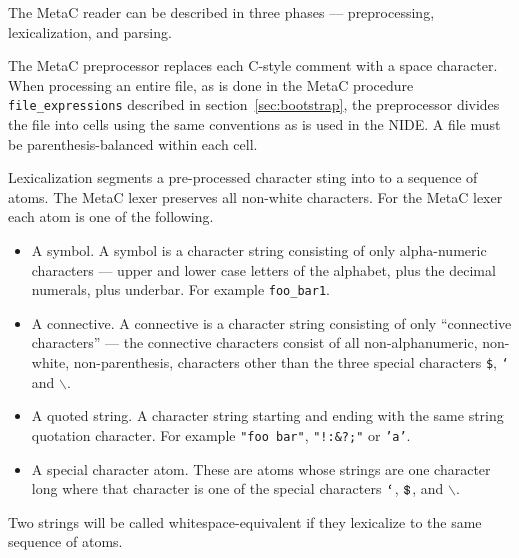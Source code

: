 \documentclass{article}
\newcommand{\mtt}[1]{\mbox{\tt #1}}
\begin{document}
The MetaC reader can be described in three phases --- preprocessing, lexicalization, and parsing.

The MetaC preprocessor replaces each C-style comment with a space character.  When processing an entire file,
as is done in the MetaC procedure {\tt file\_expressions}
described in section~\ref{sec:bootstrap}, the preprocessor divides the file into
cells using the same conventions as is used in the NIDE.
A file must be parenthesis-balanced within each cell.

Lexicalization segments a pre-processed character sting into to a sequence of atoms.
The MetaC lexer preserves all non-white characters.  For the MetaC lexer each atom is one of the following.

\begin{itemize}
\item A symbol.  A symbol is a character string consisting of only alpha-numeric characters --- upper and lower case letters of the alphabet, plus the decimal numerals, plus underbar.
  For example {\tt foo\_bar1}.
\item A connective.  A connective is a character string consisting of only ``connective characters'' --- the connective characters consist of all non-alphanumeric, non-white, non-parenthesis, characters
  other than the three special characters {\tt \$}, {\tt `} and $\backslash$.
\item A quoted string.  A character string starting and ending with the same string quotation character.  For example {\tt "foo bar"}, {\tt "!:\&?;"} or {\tt 'a'}.
\item A special character atom. These are atoms whose strings are one character long where that character is one of
  the special characters $\mtt{`}$, $\mtt{\$}$, and $\backslash$.
\end{itemize}

Two strings will be called whitespace-equivalent if they lexicalize to the same sequence of atoms.

\newcommand{\sym}{\mathrm{SYM}}
\newcommand{\conn}{\mathrm{CONN}}
\newcommand{\quot}{\mathrm{QUOTE}}
\newcommand{\misc}{\mathrm{MISC}}
\newcommand{\app}{\mathrm{APP}}
\newcommand{\var}{\mathrm{VAR}}
\end{document}
